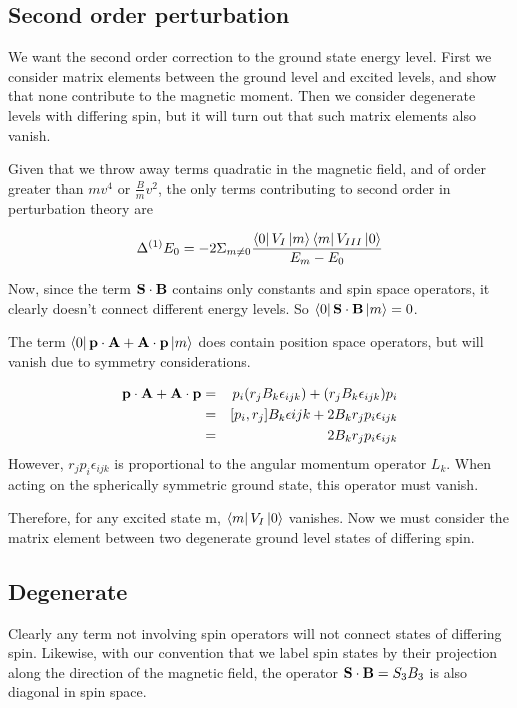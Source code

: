 \subsection*{Second order perturbation}
We want the second order correction to the ground state energy level.  First we consider matrix elements between the ground level and excited levels, and show that none contribute to the magnetic moment.  Then we consider degenerate levels with differing spin, but it will turn out that such matrix elements also vanish.

Given that we throw away terms quadratic in the magnetic field, and of order greater than $mv^4$ or $\frac{B}{m}v^2$, the only terms contributing to second order in perturbation theory are

\[ \Delta^{(1)} E_0 = -2\Sigma_{m \neq 0} \frac {\matrixel{0}{V_{I}}{m} \matrixel{m}{V_{III}}{0}} { E_m - E_0 }	\]

Now, since the term $\mathbf{S} \cdot \mathbf{B}$ contains only constants and spin space operators, it clearly doesn't connect different energy levels.  So $\matrixel{0}{\v{S} \cdot \v{B}}{m} = 0$.

The term $\matrixel{0}{\v{p} \cdot \v{A} + \v{A} \cdot \v{p}}{m}$ does contain position space operators, but will vanish due to symmetry considerations.

\begin{eqnarray*}
 \mathbf{p} \cdot \mathbf{A} + \mathbf{A} \cdot \mathbf{p} 
	&=&	p_i (r_j B_k \epsilon_{ijk} ) + (r_j B_k \epsilon_{ijk}) p_i	\\
	&=&	[p_i, r_j] B_k \epsilon{ijk} + 2 B_k r_j p_i  \epsilon_{ijk}	\\
	&=&	2 B_k r_j p_i  \epsilon_{ijk}
\end{eqnarray*}
However, $ r_j p_i \epsilon_{ijk}$ is proportional to the angular momentum operator $L_k$.  When acting on the spherically symmetric ground state, this operator must vanish.

Therefore, for any excited state m, $\matrixel{m}{V_{I}}{0}$ vanishes.  Now we must consider the matrix element between two degenerate ground level states of differing spin.

\subsection{Degenerate}
Clearly any term not involving spin operators will not connect states of differing spin.  Likewise, with our convention that we label spin states by their projection along the direction of the magnetic field, the operator $\mathbf{S} \cdot \mathbf{B} = S_3 B_3$ is also diagonal in spin space.

